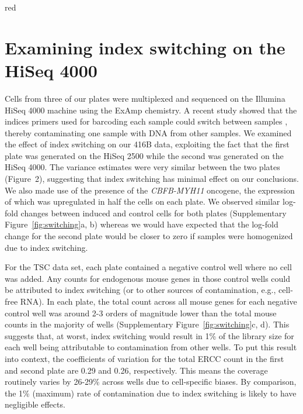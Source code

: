\documentclass{article}
\begin{document}
\begin{color}{red}
\section{Examining index switching on the HiSeq 4000}
Cells from three of our plates were multiplexed and sequenced on the Illumina HiSeq 4000 machine using the ExAmp chemistry.
A recent study showed that the indices primers used for barcoding each sample could switch between samples \citep{sinha2017index}, thereby contaminating one sample with DNA from other samples.
We examined the effect of index switching on our 416B data, exploiting the fact that the first plate was generated on the HiSeq 2500 while the second was generated on the HiSeq 4000.
The variance estimates were very similar between the two plates (Figure~2), suggesting that index switching has minimal effect on our conclusions.
We also made use of the presence of the \textit{CBFB-MYH11} oncogene, the expression of which was upregulated in half the cells on each plate.
We observed similar log-fold changes between induced and control cells for both plates (Supplementary Figure~\ref{fig:switching}a, b) whereas we would have expected that the log-fold change for the second plate would be closer to zero if samples were homogenized due to index switching.

For the TSC data set, each plate contained a negative control well where no cell was added.
Any counts for endogenous mouse genes in those control wells could be attributed to index switching (or to other sources of contamination, e.g., cell-free RNA).
In each plate, the total count across all mouse genes for each negative control well was around 2-3 orders of magnitude lower than the total mouse counts in the majority of wells (Supplementary Figure~\ref{fig:switching}c, d).
This suggests that, at worst, index switching would result in 1\% of the library size for each well being attributable to contamination from other wells.
To put this result into context, the coefficients of variation for the total ERCC count in the first and second plate are 0.29 and 0.26, respectively.
This means the coverage routinely varies by 26-29\% across wells due to cell-specific biases.
By comparison, the 1\% (maximum) rate of contamination due to index switching is likely to have negligible effects.
\end{color}

\end{document}
